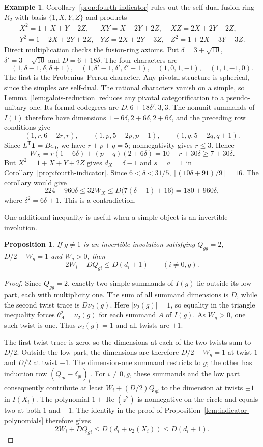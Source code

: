 \documentclass[11pt]{amsart}
\newtheorem{proposition}[theorem]{Proposition}
\theoremstyle{definition}
\newtheorem{example}[theorem]{Example}
\numberwithin{equation}{section}
\begin{document}
\begin{example}\label{ex:R2}
Corollary~\ref{prop:fourth-indicator} rules out the self-dual fusion ring
$R_2$ with basis $\{1,X,Y,Z\}$ and products
\[
\begin{array}{lll}
 X^2=1+X+Y+2Z,&XY=X+2Y+2Z,&XZ=2X+2Y+2Z,\\
 Y^2=1+2X+2Y+2Z,&YZ=2X+2Y+3Z,&Z^2=1+2X+3Y+3Z.
\end{array}
\]
Direct multiplication checks the fusion-ring axioms. Put
$\delta=3+\sqrt{10}$, $\delta'=3-\sqrt{10}$ and $D=6+18\delta$.
The four characters are
\[
 (1,\delta-1,\delta,\delta+1),\quad
 (1,\delta'-1,\delta',\delta'+1),\quad
 (1,0,1,-1),\quad(1,1,-1,0).
\]
The first is the Frobenius--Perron character. Any pivotal structure is
spherical, since the simples are self-dual. The rational characters
vanish on a simple, so Lemma~\ref{lem:galois-reduction} reduces any
pivotal categorification to a pseudo-unitary one.
Its formal codegrees are $D,6+18\delta',3,3$.
The nonunit summands of $I(1)$ therefore have dimensions
$1+6\delta,2+6\delta,2+6\delta$, and the preceding row conditions give
\[
 (1,r,6-2r,r),\qquad (1,p,5-2p,p+1),\qquad (1,q,5-2q,q+1).
\]
Since $L^{\mathsf T}\mathbf1=Be_0$, we have $r+p+q=5$;
nonnegativity gives $r\leq3$. Hence
\[
 W_X=r(1+6\delta)+(p+q)(2+6\delta)
     =10-r+30\delta\geq7+30\delta.
\]
But $X^2=1+X+Y+2Z$ gives $d_X=\delta-1$ and $s=a=1$ in
Corollary~\ref{prop:fourth-indicator}. Since $6<\delta<31/5$,
$\lfloor(10\delta+91)/9\rfloor=16$. The corollary would give
\[
 224+960\delta\leq32W_X
 \leq D\bigl(7(\delta-1)+16\bigr)=180+960\delta,
\]
where $\delta^2=6\delta+1$. This is a contradiction.
\end{example}

One additional inequality is useful when a simple object is an invertible
involution.
\begin{proposition}\label{prop:low-test}
If $g\ne1$ is an invertible involution satisfying
$Q_{gg}=2$, $D/2-W_g=1$ and $W_g>0$, then
\[
 2W_i+DQ_{gi}\leq D(d_i+1)\qquad(i\ne0,g).
\]
\end{proposition}
\begin{proof}
Since $Q_{gg}=2$, exactly two simple summands of $I(g)$ lie outside
its low part, each with multiplicity one. The sum of all summand
dimensions is $D$, while the second twist trace is $D\nu_2(g)$.
Here $|\nu_2(g)|=1$, so equality in the triangle inequality forces
$\theta_A^2=\nu_2(g)$ for each summand $A$ of $I(g)$.
As $W_g>0$, one such twist is one. Thus $\nu_2(g)=1$ and all twists
are $\pm1$.

The first twist trace is zero, so the dimensions at each of the two
twists sum to $D/2$. Outside the low part, the dimensions are therefore
$D/2-W_g=1$ at twist $1$ and $D/2$ at twist $-1$.
The dimension-one summand restricts to $g$; the other has induction row
$(Q_{gi}-\delta_{gi})_i$.
For $i\ne0,g$, these summands and the low part consequently contribute
at least $W_i+(D/2)Q_{gi}$ to the dimension at twists $\pm1$ in $I(X_i)$.
The polynomial $1+\operatorname{Re}(z^2)$ is nonnegative on the circle
and equals two at both $1$ and $-1$. The identity in the proof of
Proposition~\ref{lem:indicator-polynomials} therefore gives
\[
 2W_i+DQ_{gi}\leq D(d_i+\nu_2(X_i))\leq D(d_i+1).
\]
\end{proof}
\end{document}
